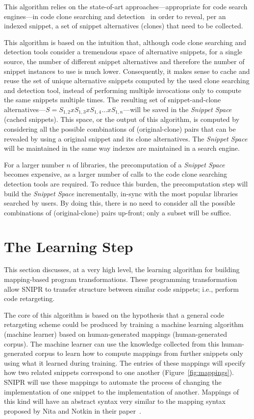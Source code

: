 This algorithm relies on the state-of-art approaches---appropriate for code search engines---in code clone searching and detection~\cite{Jiang:2007cj, Roh:2010ts} in order to reveal, per an indexed snippet, a set of snippet alternatives (clones) that need to be collected.

This algorithm is based on the intuition that, although code clone searching and detection tools consider a tremendous space of alternative snippets, for a single source, the number of different snippet alternatives and therefore the number of snippet instances to use is much lower. Consequently, it makes sense to cache and reuse the set of unique alternative snippets computed by the used clone searching and detection tool, instead of performing multiple invocations only to compute the same snippets multiple times. The resulting set of snippet-and-clone alternatives---$S = S_{1,2} x S_{1,3} x S_{1,4} ... x S_{1,n}$---will be saved in the \emph{Snippet Space} (cached snippets). This space, or the output of this algorithm, is computed by considering all the possible combinations of (original-clone) pairs that can be revealed by using a original snippet and its clone alternatives. The \emph{Snippet Space} will be maintained in the same way indexes are maintained in a search engine.

For a larger number $n$ of libraries, the precomputation of a \emph{Snippet Space} becomes expensive, as a larger number of calls to the code clone searching detection tools are required. To reduce this burden, the precomputation step will build the \emph{Snippet Space} incrementally, in-sync with the most popular libraries searched by users. By doing this, there is no need to consider all the possible combinations of (original-clone) pairs up-front; only a subset will be suffice.

\section{The Learning Step}
\label{sec:precomputation}

This section discusses, at a very high level, the learning algorithm for building mapping-based program transformations. These programming transformation allow \uppercase{SnipR} to transfer structure between similar code snippets; i.e., perform code retargeting.

The core of this algorithm is based on the hypothesis that a general code retargeting scheme could be produced by training a machine learning algorithm (machine learner) based on human-generated mappings (human-generated corpus). The machine learner can use the knowledge collected from this human-generated corpus to learn how to compute mappings from further snippets only using what it learned during training. The entries of these mappings will specify how two related snippets correspond to one another (Figure~\ref{fig:mappings}). SNIPR will use these mappings to automate the process of changing the implementation of one snippet to the implementation of another. Mappings of this kind will have an abstract syntax very similar to the mapping syntax proposed by Nita and Notkin in their paper~\cite{Nita:2010en}.

